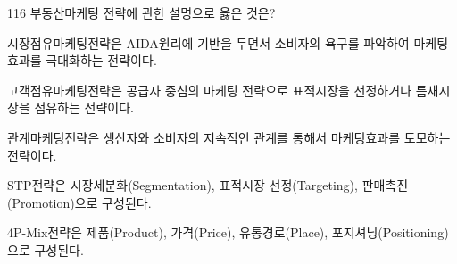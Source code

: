 \begin{question}{116}
부동산마케팅 전략에 관한 설명으로 옳은 것은?
\begin{choices}
  \item 시장점유마케팅전략은 AIDA원리에 기반을 두면서 소비자의 욕구를 파악하여 마케팅효과를 극대화하는 전략이다.
  \item 고객점유마케팅전략은 공급자 중심의 마케팅 전략으로 표적시장을 선정하거나 틈새시장을 점유하는 전략이다.
  \item 관계마케팅전략은 생산자와 소비자의 지속적인 관계를 통해서 마케팅효과를 도모하는 전략이다.
  \item STP전략은 시장세분화(Segmentation), 표적시장 선정(Targeting), 판매촉진(Promotion)으로 구성된다.
  \item 4P-Mix전략은 제품(Product), 가격(Price), 유통경로(Place), 포지셔닝(Positioning)으로 구성된다.
\end{choices}
\end{question}

